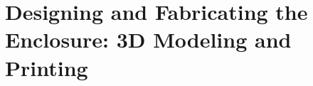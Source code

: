 \chapter{Designing and Fabricating the Enclosure: 3D Modeling and Printing}
\label{cap:3dModelingAndPrinting}